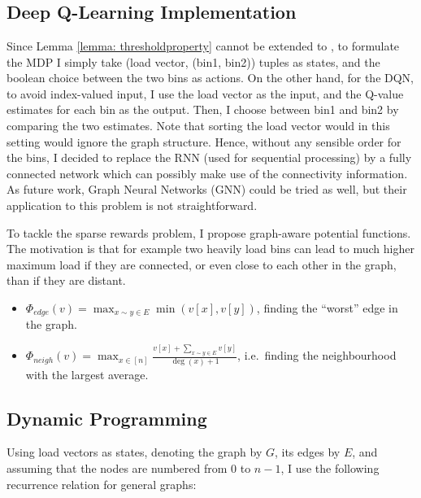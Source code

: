 \section{\GraphicalTwoChoice}


\subsection{Deep Q-Learning Implementation} \label{graphical-DQN}

Since Lemma \ref{lemma: thresholdproperty} cannot be extended to \GraphicalTwoChoice, to formulate the MDP I simply take (load vector, (bin1, bin2)) tuples as states, and the boolean choice between the two bins as actions. On the other hand, for the DQN, to avoid index-valued input, I use the load vector as the input, and the Q-value estimates for each bin as the output. Then, I choose between bin1 and bin2 by comparing the two estimates. Note that sorting the load vector would in this setting would ignore the graph structure. Hence, without any sensible order for the bins, I decided to replace the RNN (used for sequential processing) by a fully connected network which can possibly make use of the connectivity information. As future work, Graph Neural Networks (GNN) \cite{scarselli2009GNN} could be tried as well, but their application to this problem is not straightforward.



To tackle the sparse rewards problem, I propose graph-aware potential functions. The motivation is that for example two heavily load bins can lead to much higher maximum load if they are connected, or even close to each other in the graph, than if they are distant.


\begin{itemize}
    \item 
    $\Phi_{edge}(v)=\max_{x\sim y \in E} \min(v[x], v[y])$, finding the ``worst'' edge in the graph.
    \item
    $\Phi_{neigh}(v)=\max_{x \in [n]} \frac{v[x]+\sum_{x\sim y \in E}v[y]}{\deg(x)+1}$, i.e.\ finding the neighbourhood with the largest average.
\end{itemize}


\subsection{Dynamic Programming}

Using load vectors as states, denoting the graph by $G$, its edges by $E$, and assuming that the nodes are numbered from $0$ to $n-1$, I use the following recurrence relation for general graphs:


